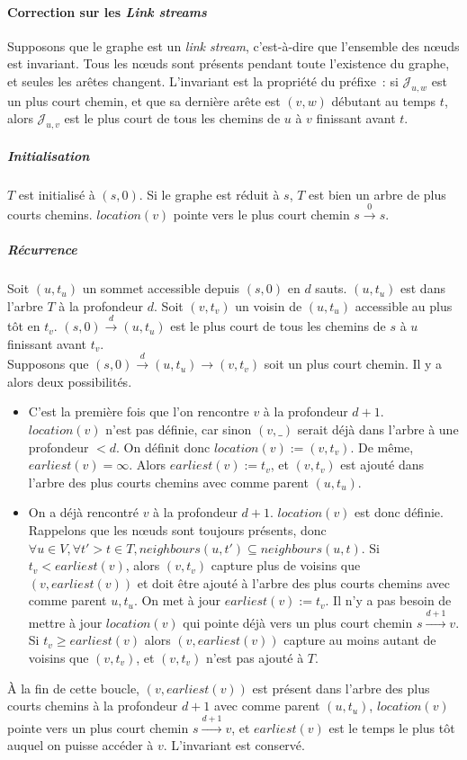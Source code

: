 \documentclass[12pt,a4paper]{article}
\begin{document}
\paragraph{Correction sur les \textit{Link streams}} Supposons que le
graphe est un \textit{link stream}, c'est-à-dire que l'ensemble des
nœuds est invariant. Tous les nœuds sont présents pendant toute
l'existence du graphe, et seules les arêtes changent. L'invariant est
la propriété du préfixe~: si \(\mathcal{J}_{u, w}\) est un plus court
chemin, et que sa dernière arête est \((v, w)\) débutant au temps
\(t\), alors \(\mathcal{J}_{u, v}\) est le plus court de tous les
chemins de \(u\) à \(v\) finissant avant \(t\).

\subparagraph{Initialisation} \(T\) est initialisé à \((s, 0)\). Si le
graphe est réduit à \(s\), \(T\) est bien un arbre de plus courts
chemins. \(location(v)\) pointe vers le plus court chemin
\(s \xrightarrow{0} s\).

\subparagraph{Récurrence} Soit \((u, t_u)\) un sommet accessible
depuis \((s, 0)\) en \(d\) sauts. \((u, t_u)\) est dans l'arbre \(T\)
à la profondeur \(d\). Soit \((v, t_v)\) un voisin de \((u, t_u)\)
accessible au plus tôt en \(t_v\). \((s, 0) \xrightarrow{d} (u, t_u)\)
est le plus court de tous les chemins de \(s\) à \(u\) finissant avant
\(t_v\). \\

Supposons que \((s, 0) \xrightarrow{d} (u, t_u) \rightarrow (v, t_v)\)
soit un plus court chemin. Il y a alors deux possibilités.
\begin{itemize}
\item C'est la première fois que l'on rencontre \(v\) à la profondeur
  \(d + 1\). \(location(v)\) n'est pas définie, car sinon \((v, \_)\)
  serait déjà dans l'arbre à une profondeur \(< d\). On définit donc
  \(location(v) := (v, t_v)\). De même, \(earliest(v) =
  \infty\). Alors \(earliest(v) := t_v\), et \((v, t_v)\) est ajouté
  dans l'arbre des plus courts chemins avec comme parent \((u, t_u)\).
\item On a déjà rencontré \(v\) à la profondeur \(d +
  1\). \(location(v)\) est donc définie. Rappelons que les nœuds sont
  toujours présents, donc
  \(\forall u \in V, \forall t' > t \in T, neighbours(u, t') \subseteq
  neighbours(u, t)\). Si \(t_v < earliest(v)\), alors \((v, t_v)\)
  capture plus de voisins que \((v, earliest(v))\) et doit être ajouté
  à l'arbre des plus courts chemins avec comme parent \(u, t_u\). On
  met à jour \(earliest(v) := t_v\). Il n'y a pas besoin de mettre à
  jour \(location(v)\) qui pointe déjà vers un plus court chemin
  \(s \xrightarrow{d+1} v\). Si \(t_v \geq earliest(v)\) alors
  \((v, earliest(v))\) capture au moins autant de voisins que
  \((v, t_v)\), et \((v, t_v)\) n'est pas ajouté à \(T\).
\end{itemize}
À la fin de cette boucle, \((v, earliest(v))\) est présent dans
l'arbre des plus courts chemins à la profondeur \(d + 1\) avec comme
parent \((u, t_u)\), \(location(v)\) pointe vers un plus court chemin
\(s \xrightarrow{d+1} v\), et \(earliest(v)\) est le temps le plus tôt
auquel on puisse accéder à \(v\). L'invariant est conservé.\\
\end{document}
